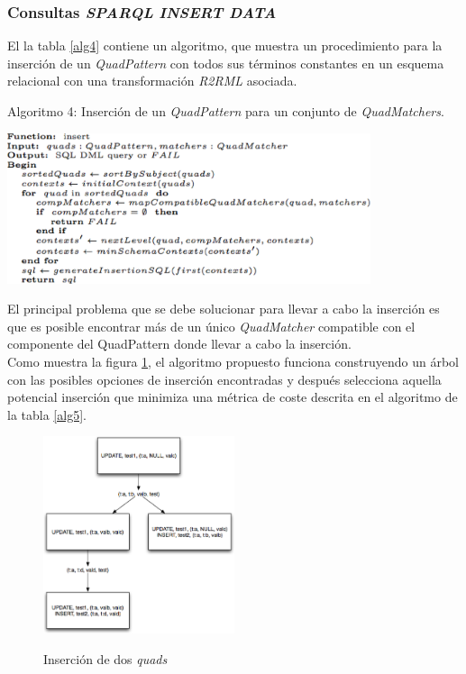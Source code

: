 \subsubsection{Consultas \textit{SPARQL} \textit{INSERT DATA}}

El la tabla \ref{alg4} contiene un algoritmo, que  muestra un procedimiento para la inserci\'on de un \textit{QuadPattern} con todos sus t\'erminos constantes en un esquema relacional con una transformaci\'on \textit{R2RML} asociada.\\

\begin{table}
\vspace{2.4in}
\caption{Algoritmo 4: Inserci\'on de un \textit{QuadPattern} para un conjunto de \textit{QuadMatchers}.}
\includegraphics[width=0.8\textwidth]{algoritmo4}
\label{alg4}
\end{table}


El principal problema que se debe solucionar para llevar a cabo la inserci\'on es que es posible encontrar m\'as de un \'unico \textit{QuadMatcher} compatible con el componente del QuadPattern donde llevar a cabo la inserci\'on.\\
Como muestra la figura \ref{figura3}, el algoritmo propuesto funciona construyendo un \'arbol con las posibles opciones de inserci\'on encontradas y despu\'es selecciona aquella potencial inserci\'on que minimiza una m\'etrica de coste descrita en el algoritmo de la tabla \ref{alg5}.

\begin{figure}
\vspace{2.4in}
\caption{Inserci\'on de dos \textit{quads}}
\includegraphics[width=0.5\textwidth]{figura3}
\label{figura3}
\end{figure}

